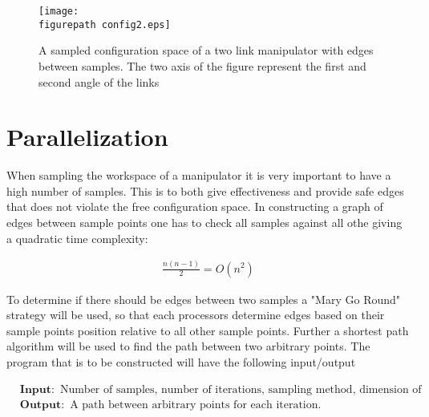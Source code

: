 \begin{figure}[h!] 
 \center 
 \texttt{[image: \\figurepath config2.eps]}
 \caption{ A sampled configuration space of a two link manipulator with edges between samples. The two axis of the figure represent the first and second angle of the links \label{fig:c1}}
 \end{figure}



\section*{Parallelization}
When sampling the workspace of a manipulator it is very important to have a high number of samples. This is to both give effectiveness and provide safe edges that does not violate the free configuration space. In constructing a graph of edges between sample points one has to check all samples against all othe giving a quadratic time complexity:

\begin{align}
\label{eq:}
 \frac{n(n-1)}{2}=O(n^2) 
 \end{align}

To determine if there should be edges between two samples a "Mary Go Round" strategy will be used, so that each processors determine edges based on their sample points position relative to all other sample points. Further a shortest path algorithm will be used to find the path between two arbitrary points. 
The program that is to be constructed will have the following input/output

\begin{align}
\label{eq:}
&\mathbf{Input: } \text{ Number of samples, number of iterations, sampling method, dimension of configuration space. } \nonumber \\
 &\mathbf{Output: } \text{ A path between arbitrary points for each iteration.} \nonumber
 \end{align}









